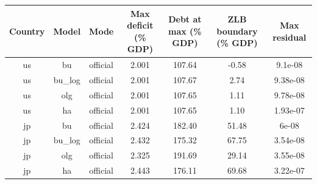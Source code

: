\begin{table}[!ht]
\setlength\tabcolsep{0.425em}
\setlength\aboverulesep{0pt}
\setlength\belowrulesep{0.2em}
\centering
\begin{threeparttable}
\begin{tabular}{ccccccc}
\toprule[0.1em]
Country & Model & Mode & Max deficit (\% GDP) & Debt at max (\% GDP) & ZLB boundary (\% GDP) & Max residual \\[0.2em]
\midrule[0.075em]
us & bu & official & 2.001 & 107.64 & -0.58 & 9.1e-08 \\[0.2em]
us & bu\_log & official & 2.001 & 107.67 & 2.74 & 9.38e-08 \\[0.2em]
us & olg & official & 2.001 & 107.65 & 1.11 & 9.78e-08 \\[0.2em]
us & ha & official & 2.001 & 107.65 & 1.10 & 1.93e-07 \\[0.2em]
jp & bu & official & 2.424 & 182.40 & 51.48 & 6e-08 \\[0.2em]
jp & bu\_log & official & 2.432 & 175.32 & 67.75 & 3.54e-08 \\[0.2em]
jp & olg & official & 2.325 & 191.69 & 29.14 & 3.55e-08 \\[0.2em]
jp & ha & official & 2.443 & 176.11 & 69.68 & 3.22e-07 \\[0.2em]
\bottomrule[0.1em]
\end{tabular}
\end{threeparttable}
\end{table}
